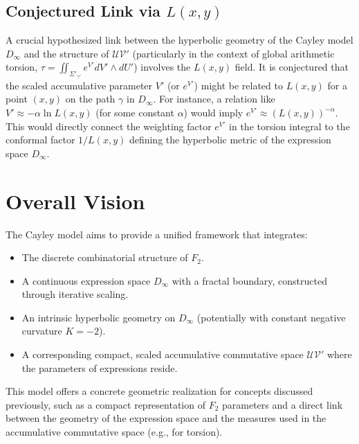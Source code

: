 \documentclass[12pt, a4paper]{article}
\begin{document}
\subsection{Conjectured Link via $L(x,y)$}
A crucial hypothesized link between the hyperbolic geometry of the Cayley model $D_\infty$ and the structure of $\mathcal{UV}'$ (particularly in the context of global arithmetic torsion, $\tau = \iint_{\Sigma'_{\gamma'}} e^{V'} dV' \wedge dU'$) involves the $L(x,y)$ field. It is conjectured that the scaled accumulative parameter $V'$ (or $e^{V'}$) might be related to $L(x,y)$ for a point $(x,y)$ on the path $\gamma$ in $D_\infty$. For instance, a relation like $V' \approx -\alpha \ln L(x,y)$ (for some constant $\alpha$) would imply $e^{V'} \approx (L(x,y))^{-\alpha}$. This would directly connect the weighting factor $e^{V'}$ in the torsion integral to the conformal factor $1/L(x,y)$ defining the hyperbolic metric of the expression space $D_\infty$.

\section{Overall Vision}
The Cayley model aims to provide a unified framework that integrates:
\begin{itemize}
    \item The discrete combinatorial structure of $F_2$.
    \item A continuous expression space $D_\infty$ with a fractal boundary, constructed through iterative scaling.
    \item An intrinsic hyperbolic geometry on $D_\infty$ (potentially with constant negative curvature $K=-2$).
    \item A corresponding compact, scaled accumulative commutative space $\mathcal{UV}'$ where the parameters of expressions reside.
\end{itemize}
This model offers a concrete geometric realization for concepts discussed previously, such as a compact representation of $F_2$ parameters and a direct link between the geometry of the expression space and the measures used in the accumulative commutative space (e.g., for torsion).
\end{document}
